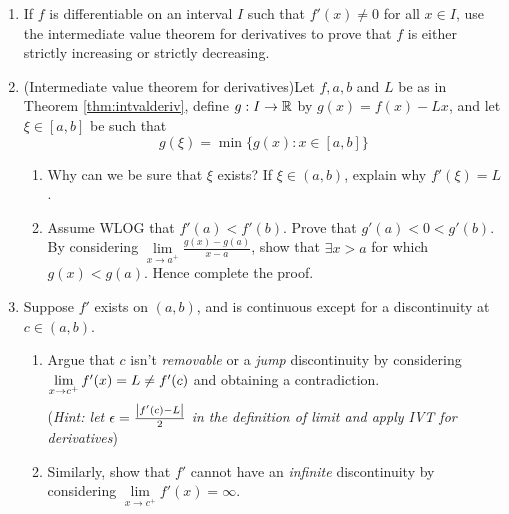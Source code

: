 \begin{exercises}{}
\begin{enumerate}
		
	  \item\label{exs:fincdec} If $f$ is differentiable on an interval $I$ such that $f'(x)\neq 0$ for all $x\in I$, use the intermediate value theorem for derivatives to prove that $f$ is either strictly increasing or strictly decreasing.
	  
	  
	  \item\label{exs:ivtderivs} (Intermediate value theorem for derivatives)\quad Let $f,a,b$ and $L$ be as in Theorem \ref{thm:intvalderiv}, define $g:I\to\mathbb{R}$ by $g(x)=f(x)-Lx$, and let $\xi\in[a,b]$ be such that
		\[
			g(\xi)=\min\bigl\{g(x):x\in[a,b]\bigr\}
		\]
		\begin{enumerate}
		  \item Why can we be sure that $\xi$ exists? If $\xi\in(a,b)$, explain why $f'(\xi)=L$.
			\item Assume WLOG that $f'(a)<f'(b)$. Prove that $g'(a)<0<g'(b)$. By considering $\lim\limits_{x\to a^+}\frac{g(x)-g(a)}{x-a}$, show that $\exists x>a$ for which $g(x)<g(a)$. Hence complete the proof.
		\end{enumerate}
	  
	  
	  \item Suppose $f'$ exists on $(a,b)$, and is continuous except for a discontinuity at $c\in(a,b)$.
	  \begin{enumerate}
	    \item Argue that $c$ isn't \emph{removable} or a \emph{jump} discontinuity by considering $\smash[b]{\lim\limits_{x\to c^+}f'(x)=L\neq f'(c)}$ and obtaining a contradiction.\par
	    (\emph{Hint: let $\epsilon=\frac{\left| f'(c)-L\right|}2$ in the definition of limit and apply IVT for derivatives})
	    
	    \item Similarly, show that $f'$ cannot have an \emph{infinite} discontinuity by considering $\lim\limits_{x\to c^+}f'(x)=\infty$.
	    

\end{enumerate}
\end{enumerate}
\end{exercises}
